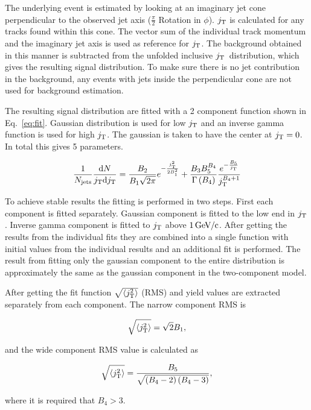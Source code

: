 The underlying event is estimated by looking at an imaginary jet cone perpendicular to the observed jet axis ($\frac{\pi}{2}$ Rotation in $\phi$). $j_{\rm T}$ is calculated for any tracks found within this cone. The vector sum of the individual track momentum and the imaginary jet axis is used as reference for $j_{\rm T}$. The background obtained in this manner is subtracted from the unfolded inclusive $j_{\rm T}$ distribution, which gives the resulting signal distribution. To make sure there is no jet contribution in the background, any events with jets inside the perpendicular cone are not used for background estimation.

 

The resulting signal distribution are fitted with a 2 component function shown in Eq.~\ref{eq:fit}. Gaussian distribution is used for low $j_{\rm T}$ and an inverse gamma function is used for high $j_{\rm T}$. The gaussian is taken to have the center at $j_{\rm T} = 0$. In total this gives 5 parameters. ~\cite{ALICEjt}

\begin{equation}
\frac{1}{N_{\mathrm{jets}}}\frac{\mathrm{d}N}{j_{\rm T} \mathrm{d}j_{\rm T}} = \frac{B_2}{B_1\sqrt{2\pi}}e^{-\frac{j_{\rm T}^2}{2B_1^2}}+\frac{B_3B_5^{B_4}}{\Gamma\left(B_4\right)}\frac{e^{-\frac{B_5}{j_{\rm T}}}}{j_{\rm T}^{B_4+1}}
\label{eq:fit}
\end{equation}

To achieve stable results the fitting is performed in two steps. First each component is fitted separately. Gaussian component is fitted to the low end in $j_{\rm T}$. Inverse gamma component is fitted to $j_{\rm T}$ above $\unit[1]{\GeVc}$. After getting the results from the individual fits they are combined into a single function with initial values from the individual results and an additional fit is performed. The result from fitting only 
the gaussian component to the entire distribution is approximately the same as the gaussian component in the two-component model.

After getting the fit function $\sqrt{\left<j_{\rm T}^2\right>}$ (RMS) and yield values are  extracted separately from each component. The narrow component RMS is

$$\sqrt{\left<j_{\rm T}^2\right>}=\sqrt{2}B_1,$$

and the wide component RMS value is calculated as 

$$\sqrt{\left<j_{\rm T}^2\right>}=\frac{B_5}{\sqrt{\left(B_4-2\right)\left(B_4-3\right)}},$$

where it is required that $B_4 > 3$.

